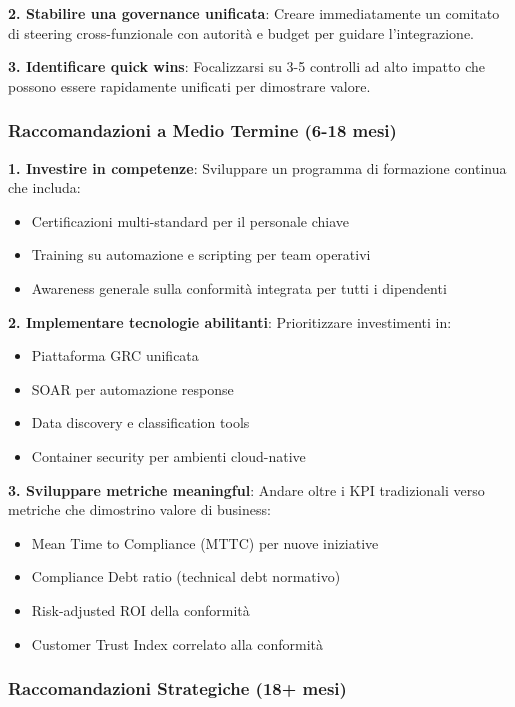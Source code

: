 \textbf{2. Stabilire una governance unificata}:
Creare immediatamente un comitato di steering cross-funzionale con autorità e budget per guidare l'integrazione.

\textbf{3. Identificare quick wins}:
Focalizzarsi su 3-5 controlli ad alto impatto che possono essere rapidamente unificati per dimostrare valore.

\subsubsection{Raccomandazioni a Medio Termine (6-18 mesi)}

\textbf{1. Investire in competenze}:
Sviluppare un programma di formazione continua che includa:
\begin{itemize}
    \item Certificazioni multi-standard per il personale chiave
    \item Training su automazione e scripting per team operativi
    \item Awareness generale sulla conformità integrata per tutti i dipendenti
\end{itemize}

\textbf{2. Implementare tecnologie abilitanti}:
Prioritizzare investimenti in:
\begin{itemize}
    \item Piattaforma GRC unificata
    \item SOAR per automazione response
    \item Data discovery e classification tools
    \item Container security per ambienti cloud-native
\end{itemize}

\textbf{3. Sviluppare metriche meaningful}:
Andare oltre i KPI tradizionali verso metriche che dimostrino valore di business:
\begin{itemize}
    \item Mean Time to Compliance (MTTC) per nuove iniziative
    \item Compliance Debt ratio (technical debt normativo)
    \item Risk-adjusted ROI della conformità
    \item Customer Trust Index correlato alla conformità
\end{itemize}

\subsubsection{Raccomandazioni Strategiche (18+ mesi)}

